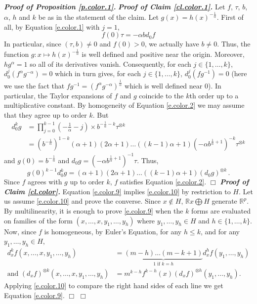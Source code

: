\documentclass[10pt,twoside]{article}
\newcommand{\R}{\mathbb{R}}
\newenvironment{prf}[1][]
{\vskip 2mm  {\it \bf Proof#1. }}{$\Box$ \vskip 2mm}
\numberwithin{theorem}{section}
\begin{document}
\begin{prf}[ of Proposition \ref{p.color.1}]
\begin{prf}[ of Claim \ref{cl.color.1}]
Let $f$, $\tau$, $b$, $\alpha$, $h$ and $k$ be as in the statement of the claim. Let $g(x)=h(x)^{-\frac{1}{\alpha}}$. First of all, by Equation \eqref{e.color.1} with $j=1$,
\[
f(0)\tau = -\alpha b d_0f
\]
In particular, since $(\tau,b)\neq 0$ and $f(0)>0$, we actually have $b\neq 0$. Thus, the function $g:x\mapsto h(x)^{-\frac{1}{\alpha}}$ is well defined and positive near the origin. Moreover, $hg^\alpha=1$ so all of its derivatives vanish. Consequently, for each $j\in\{1,\dots,k\}$, $d^j_0(f^\alpha g^{-\alpha})=0$ which in turn gives, for each $j\in\{1,\dots,k\}$, $d^j_0(fg^{-1})=0$ (here we use the fact that $fg^{-1}=\left(f^\alpha g^{-\alpha}\right)^{\frac 1\alpha}$ which is well defined near $0$). In particular, the Taylor expansions of $f$ and $g$ coincide to the $k$th order up to a multiplicative constant. By homogeneity of Equation \eqref{e.color.2} we may assume that they agree up to order $k$. But
\begin{align*}
d^k_0g &= \prod_{j=0}^{k-1}\left(-\frac{1}{\alpha}-j\right)\times b^{-\frac{1}{\alpha}-k}\tau^{\otimes k}\\
&=\left(b^{-\frac{1}{\alpha}}\right)^{1-k}(\alpha+1)(2\alpha+1)\dots((k-1)\alpha+1)\left(-\alpha b^{\frac{1}{\alpha}+1}\right)^{-k}\tau^{\otimes k}
\end{align*}
and $g(0)=b^{-\frac{1}{\alpha}}$ and $d_0g = \left(-\alpha b^{\frac{1}{\alpha}+1}\right)^{-1}\tau$.
Thus,
\[
g(0)^{k-1}d^k_0g =(\alpha+1)(2\alpha+1)\dots((k-1)\alpha+1)(d_0g)^{\otimes k}\, .
\]
Since $f$ agrees with $g$ up to order $k$, $f$ satisfies Equation \eqref{e.color.2}.
\end{prf}
\begin{prf}[ of Claim \ref{cl.color}]
Equation \eqref{e.color.9} implies \eqref{e.color.10} by restriction to $H$. Let us assume \eqref{e.color.10} and prove the converse. Since $x\notin H$, $\R x\bigoplus H$ generate $\R^p$. By multilinearity, it is enough to prove \eqref{e.color.9} when the $k$ forms are evaluated on families of the form $(x,\dots,x,y_1,\dots,y_h)$ where $y_1,\dots,y_h\in H$ and $h\in\{1,\dots,k\}$. Now, since $f$ is homogeneous, by Euler's Equation, for any $h\leq k$, and for any $y_1,\dots,y_h\in H$,
\begin{align*}
d^k_xf(x,\dots,x,y_1,\dots,y_h)&=\underbrace{(m-h)\dots(m-k+1)}_{1\text{ if }k=h}d^h_xf(y_1,\dots,y_h)\\
\text{and }(d_xf)^{\otimes k}(x,\dots,x,y_1,\dots,y_h)&=m^{k-h}f^{k-h}(x)(d_xf)^{\otimes h}(y_1,\dots,y_h).
\end{align*}
Applying \eqref{e.color.10} to compare the right hand sides of each line we get Equation \eqref{e.color.9}.
\end{prf}
\end{prf}
\end{document}
